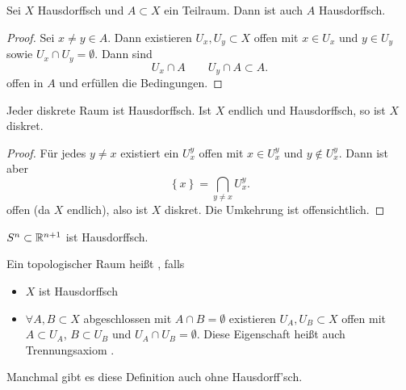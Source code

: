 \begin{lemma}\label{lm:teilraum-von-hausdorffraum-ist-hausdorff}
    Sei $X$ Hausdorffsch und $A\subset X$ ein Teilraum. Dann ist auch $A$ Hausdorffsch.
\end{lemma}
\begin{proof}
    Sei $x\neq y\in A$. Dann existieren $U_x, U_y\subset X$ offen mit $x\in U_x$ und $y\in U_y$ sowie $U_x \cap U_y = \emptyset$. Dann sind
    \[
    U_x \cap A \qquad U_y \cap A \subset A
    .\] 
    offen in $A$ und erfüllen die Bedingungen.
\end{proof}


\begin{remark}
    Jeder diskrete Raum ist Hausdorffsch. Ist $X$ endlich und Hausdorffsch, so ist  $X$ diskret.
\end{remark}
\begin{proof}
    Für jedes $y\neq x$ existiert ein $U_x^y$ offen mit  $x\in U_x^y$ und $y\not\in U_x^y$. Dann ist aber
    \[
    \left \{x\right\}  = \bigcap_{y\neq x} U_x^{y}
    .\] 
    offen (da $X$ endlich), also ist $X$ diskret. Die Umkehrung ist offensichtlich.
\end{proof}
\begin{example}
    $S^n \subset \mathbb{R}^{n+1}$ ist Hausdorffsch.
\end{example}

\begin{definition}[Normal]\label{def:normal}
    Ein topologischer Raum heißt , falls
    \begin{itemize}
        \item $X$ ist Hausdorffsch
        \item  $\forall A,B\subset X$ abgeschlossen mit $A \cap B = \emptyset$ existieren $U_A, U_B \subset X$ offen mit $A\subset U_A$, $B\subset U_B$ und $U_A \cap U_B = \emptyset$. Diese Eigenschaft heißt auch Trennungsaxiom . \\
            \begin{minipage}{\textwidth}
                \centering
                \begin{minipage}{0.3\textwidth}
                \end{minipage}
            \end{minipage}
    \end{itemize}
\end{definition}


\begin{remark}
    Manchmal gibt es diese Definition auch ohne Hausdorff'sch.
\end{remark}

